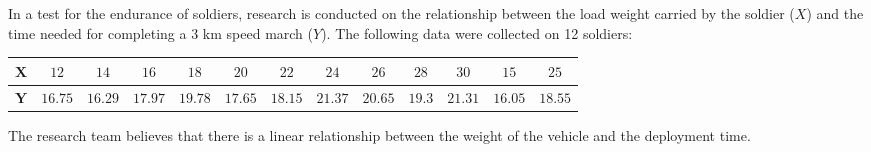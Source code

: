 \begin{enquestion}{15}{
    In a test for the endurance of soldiers, research is conducted on the relationship between the load weight carried by the soldier ($X$) and the time needed for completing a 3 km speed march ($Y$).
    The following data were collected on 12 soldiers:

    \begin{center}
        \begin{tabular}{c|cccccccccccc}
            \toprule
                $\mathbf{X}$ & $12$ & $14$ & $16$ & $18$ & $20$ & $22$ & $24$ & $26$ & $28$ & $30$ & $15$ & $25$ \\
            \midrule
                $\mathbf{Y}$ & $16.75$ & $16.29$ & $17.97$ & $19.78$ & $17.65$ & $18.15$ & $21.37$ & $20.65$ & $19.3$ & $21.31$ & $16.05$ & $18.55$ \\
            \bottomrule
        \end{tabular}
    \end{center}

    The research team believes that there is a linear relationship between the weight of the vehicle and the deployment time.
}
    


\end{enquestion}
